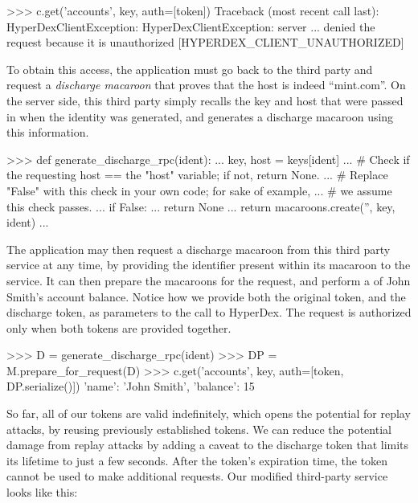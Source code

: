 \begin{pythoncode}
>>> c.get('accounts', key, auth=[token])
Traceback (most recent call last):
HyperDexClientException: HyperDexClientException: server ... denied the request because it is unauthorized [HYPERDEX_CLIENT_UNAUTHORIZED]
\end{pythoncode}

To obtain this access, the application must go back to the third party and
request a {\em discharge macaroon} that proves that the host is indeed
``mint.com''.  On the server side, this third party simply recalls the key and
host that were passed in when the identity was generated, and generates a
discharge macaroon using this information.

\begin{pythoncode}
>>> def generate_discharge_rpc(ident):
...     key, host = keys[ident]
...     # Check if the requesting host == the "host" variable; if not, return None.
...     # Replace "False" with this check in your own code; for sake of example,
...     # we assume this check passes.
...     if False:
...         return None
...     return macaroons.create('', key, ident)
...
\end{pythoncode}

The application may then request a discharge macaroon from this third party
service at any time, by providing the identifier present within its macaroon to
the service.  It can then prepare the macaroons for the request, and perform a
 of John Smith's account balance.  Notice how we provide both the
original token, and the discharge token, as parameters to the call to HyperDex.
The request is authorized only when both tokens are provided together.

\begin{pythoncode}
>>> D = generate_discharge_rpc(ident)
>>> DP = M.prepare_for_request(D)
>>> c.get('accounts', key, auth=[token, DP.serialize()])
{'name': 'John Smith', 'balance': 15}
\end{pythoncode}

So far, all of our tokens are valid indefinitely, which opens the potential for
replay attacks, by reusing previously established tokens.  We can reduce the
potential damage from replay attacks by adding a caveat to the discharge token
that limits its lifetime to just a few seconds.  After the token's expiration
time, the token cannot be used to make additional requests.  Our modified
third-party service looks like this:

